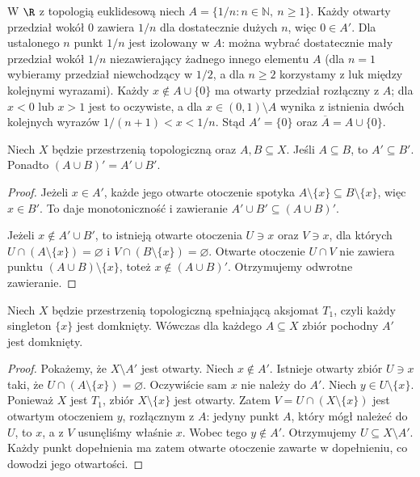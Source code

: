 \begin{przyklad}
\label{ex:topog-pochodny-ciag}
W $\R$ z topologią euklidesową niech
$A=\{1/n:n\in\mathbb N,\ n\ge1\}$.
Każdy otwarty przedział wokół $0$ zawiera $1/n$
dla dostatecznie dużych $n$, więc $0\in A'$.
Dla ustalonego $n$ punkt $1/n$ jest izolowany w $A$:
można wybrać dostatecznie mały przedział wokół $1/n$
niezawierający żadnego innego elementu $A$
(dla $n=1$ wybieramy przedział niewchodzący w $1/2$,
a dla $n\ge2$ korzystamy z luk między kolejnymi wyrazami).
Każdy $x\notin A\cup\{0\}$ ma otwarty przedział
rozłączny z $A$; dla $x<0$ lub $x>1$ jest to oczywiste,
a dla $x\in(0,1)\setminus A$ wynika z istnienia dwóch
kolejnych wyrazów $1/(n+1)<x<1/n$.
Stąd $A'=\{0\}$ oraz $\overline A=A\cup\{0\}$.
\end{przyklad}

\begin{stwierdzenie}
\label{prop:topog-pochodny-monotoniczny}
Niech $X$ będzie przestrzenią topologiczną oraz $A,B\subseteq X$.
Jeśli $A\subseteq B$, to $A'\subseteq B'$.
Ponadto $(A\cup B)'=A'\cup B'$.
\end{stwierdzenie}
\begin{proof}
Jeżeli $x\in A'$, każde jego otwarte otoczenie spotyka
$A\setminus\{x\}\subseteq B\setminus\{x\}$,
więc $x\in B'$. To daje monotoniczność i zawieranie
$A'\cup B'\subseteq(A\cup B)'$.

Jeżeli $x\notin A'\cup B'$, to istnieją otwarte otoczenia
$U\ni x$ oraz $V\ni x$, dla których
$U\cap(A\setminus\{x\})=\varnothing$ i
$V\cap(B\setminus\{x\})=\varnothing$.
Otwarte otoczenie $U\cap V$ nie zawiera punktu
$(A\cup B)\setminus\{x\}$, toteż
$x\notin(A\cup B)'$. Otrzymujemy odwrotne zawieranie.
\end{proof}

\begin{twierdzenie}
\label{thm:topog-pochodny-t1}
Niech $X$ będzie przestrzenią topologiczną spełniającą
aksjomat $T_1$, czyli każdy singleton $\{x\}$ jest domknięty.
Wówczas dla każdego $A\subseteq X$ zbiór pochodny $A'$ jest domknięty.
\end{twierdzenie}
\begin{proof}
Pokażemy, że $X\setminus A'$ jest otwarty.
Niech $x\notin A'$. Istnieje otwarty zbiór $U\ni x$
taki, że $U\cap(A\setminus\{x\})=\varnothing$.
Oczywiście sam $x$ nie należy do $A'$.
Niech $y\in U\setminus\{x\}$. Ponieważ $X$ jest $T_1$,
zbiór $X\setminus\{x\}$ jest otwarty.
Zatem $V=U\cap(X\setminus\{x\})$ jest otwartym
otoczeniem $y$, rozłącznym z $A$:
jedyny punkt $A$, który mógł należeć do $U$, to $x$,
a z $V$ usunęliśmy właśnie $x$.
Wobec tego $y\notin A'$. Otrzymujemy $U\subseteq X\setminus A'$.
Każdy punkt dopełnienia ma zatem otwarte otoczenie
zawarte w dopełnieniu, co dowodzi jego otwartości.
\end{proof}

